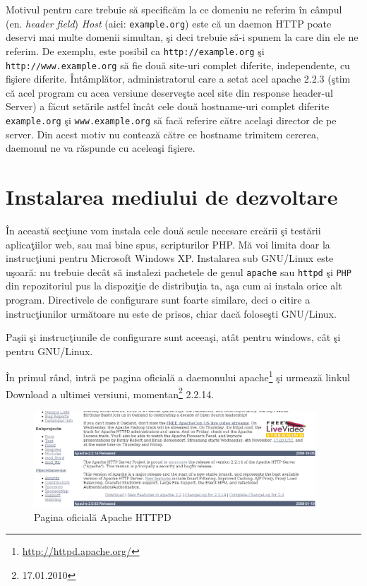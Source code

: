 Motivul pentru care trebuie să specificăm la ce domeniu ne referim în câmpul
(en. \textsl{header field}) \textsl{Host} (aici: \texttt{example.org}) este că un daemon HTTP
poate deservi mai multe domenii simultan, şi deci trebuie să-i spunem la care
din ele ne referim.
De exemplu, este posibil ca \texttt{http://example.org} şi
\texttt{http://www.example.org} să fie două site-uri complet diferite, independente, cu
fişiere diferite. Întâmplător, administratorul care a setat acel apache 2.2.3 (ştim că
acel program cu acea versiune deserveşte acel site din response header-ul {\glqq}Server{\grqq}) a făcut setările astfel
încât cele două hostname-uri complet diferite \texttt{example.org} şi \texttt{www.example.org}
să facă referire către acelaşi director de pe server. Din acest motiv nu contează
către ce hostname trimitem cererea, daemonul ne va răspunde cu aceleaşi fişiere.

\section{Instalarea mediului de dezvoltare}
În această secţiune vom instala cele două scule necesare creării şi testării
aplicaţiilor web, sau mai bine spus, scripturilor PHP. Mă voi limita doar
la instrucţiuni
pentru Microsoft Windows XP. Instalarea sub GNU/Linux este uşoară: nu trebuie
decât să instalezi pachetele de genul \texttt{apache} sau \texttt{httpd}
şi \texttt{PHP} din repozitoriul
pus la dispoziţie de distribuţia ta, aşa cum ai instala orice alt program.
Directivele de configurare sunt foarte similare, deci o citire a instrucţiunilor
următoare nu este de prisos, chiar dacă foloseşti GNU/Linux.

Paşii şi instrucţiunile de configurare sunt aceeaşi,
atât pentru windows, cât şi pentru GNU/Linux.

În primul rând, intră pe pagina oficială a daemonului
apache\footnote{\url{http://httpd.apache.org/}} şi urmează linkul
Download a ultimei versiuni, momentan\footnote{17.01.2010} 2.2.14.


\begin{figure}[h!]
  \centering
    \includegraphics[width=400px]{cap01/Screenshot.png}
  \caption{Pagina oficială Apache HTTPD}
  \label{fig:httpd homepage}
\end{figure}



